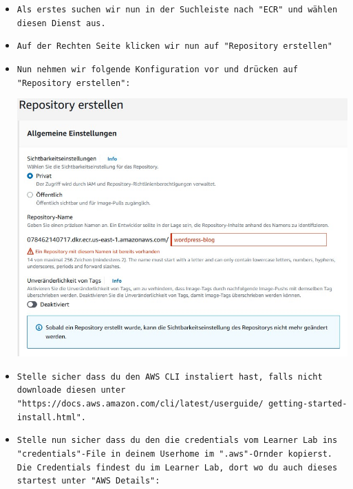 \documentclass{article}
\begin{document}
\begin{itemize}
\item \texttt{Als erstes suchen wir nun in der Suchleiste nach "ECR" und wählen diesen Dienst aus.} \\

\item \texttt{Auf der Rechten Seite klicken wir nun auf "Repository erstellen"} \\

\clearpage

\item \texttt{Nun nehmen wir folgende Konfiguration vor und drücken auf "Repository erstellen":
} \\

\begin{center}
    \includegraphics[width=13cm]{images/wordpress_1.jpg}
\end{center}

\item \texttt{Stelle sicher dass du den AWS CLI instaliert hast, falls nicht downloade diesen unter "https://docs.aws.amazon.com/cli/latest/userguide/ getting-started-install.html".} \\

\clearpage

\item \texttt{Stelle nun sicher dass du den die credentials vom Learner Lab ins "credentials"-File in deinem Userhome im ".aws"-Ornder kopierst. Die Credentials findest du im Learner Lab, dort wo du auch dieses startest unter "AWS Details": 
} \\


\end{itemize}
\end{document}
